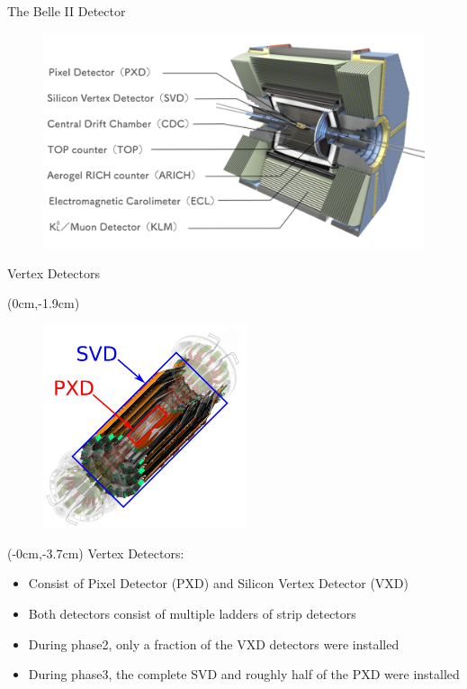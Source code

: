 \documentclass[8pt]{beamer}
\begin{document}
\begin{frame}{The Belle II Detector}

\begin{figure}
	\includegraphics[width=\textwidth]{VBilder/Belle2.pdf}
\end{figure}


	
\end{frame}

\begin{frame}{Vertex Detectors}
	
	
		\begin{textblock*}{10cm}(0cm,-1.9cm)
		\begin{figure}
			\includegraphics[width=6cm]{VBilder/PXD_SVD}
		\end{figure}
		
		
	\end{textblock*}
	
	
	\begin{textblock*}{10cm}(-0cm,-3.7cm)
		Vertex Detectors:		
			\begin{itemize}
				\item Consist of Pixel Detector (PXD) and Silicon Vertex Detector (VXD)
				\item Both detectors consist of multiple ladders of strip detectors
				\item During phase2, only a fraction of the VXD detectors were installed
				\item During phase3, the complete SVD and roughly half of the PXD were installed
	
			\end{itemize}
		



	\end{textblock*}
	
	

	
	
	
\end{frame}
\end{document}
